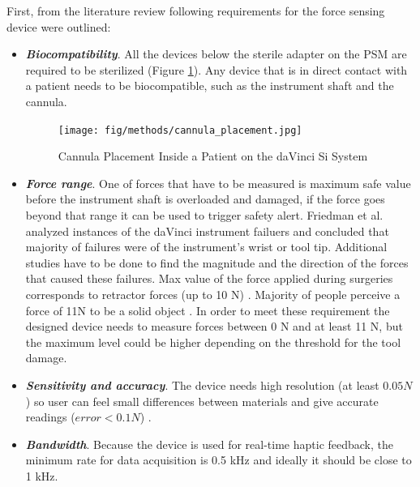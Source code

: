 	First, from the literature review following requirements for the force sensing device were outlined:
\begin{itemize}
    \item \textbf{\textit{Biocompatibility}}. All the devices below the sterile adapter on the PSM are required to be sterilized (Figure \ref{fig:Can_inside}). Any device that is in direct contact with a patient needs to be biocompatible, such as the instrument shaft and the cannula.
    
\begin{figure}[h]
	\begin{center}
		\texttt{[image: fig/methods/cannula\_placement.jpg]}
	\end{center}
	\vspace{-4mm}
	\caption[Cannula Placement Inside a Patient on the daVinci Si System]
	{Cannula Placement Inside a Patient on the daVinci Si System \cite{_intuitive_2018}}
	\label{fig:Can_inside}
	\vspace{-2mm}
\end{figure}
    
    \item \textbf{\textit{Force range}}. One of forces that have to be measured is maximum safe value before the instrument shaft is overloaded and damaged, if the force goes beyond that range it can be used to trigger safety alert. Friedman et al. analyzed instances of the daVinci instrument failuers \cite{friedman_instrument_2013} and concluded that majority of failures were of the instrument’s wrist or tool tip. Additional studies have to be done to find the magnitude and the direction of the forces that caused these failures. Max value of the force applied during surgeries corresponds to retractor forces (up to 10 N)  \cite{prasad_modular_2003}. Majority of people perceive a force of 11N to be a solid object \cite{mack_interactive_2012}. In order to meet these requirement the designed device needs to measure forces between 0 N and at least 11 N, but the maximum level could be higher depending on the threshold for the tool damage. 
    
    \item \textbf{\textit{Sensitivity and accuracy}}. The device needs high resolution (at least $0.05 N$) so user can feel small differences between materials and give accurate readings ($error < 0.1 N$) \cite{mack_interactive_2012}.
    
    \item \textbf{\textit{Bandwidth}}. Because the device is used for real-time haptic feedback, the minimum rate for data acquisition is 0.5 kHz \cite{seungmoon_choi_effect_2004} and ideally it should be close to 1 kHz.
    

\end{itemize}
